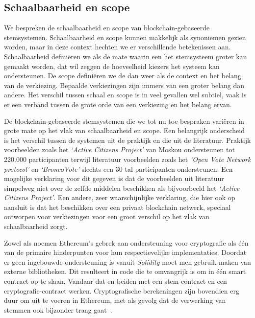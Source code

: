 	\subsection{Schaalbaarheid en scope}
	We bespreken de schaalbaarheid en scope van blockchain-gebaseerde stemsystemen. Schaalbaarheid en scope kunnen makkelijk als synoniemen gezien worden, maar in deze context hechten we er verschillende betekenissen aan. Schaalbaarheid definiëren we als de mate waarin een het stemsysteem groter kan gemaakt worden, dat wil zeggen de hoeveelheid kiezers het systeem kan ondersteunen. De scope definiëren we de dan weer als de context en het belang van de verkiezing. Bepaalde verkiezingen zijn immers van een groter belang dan andere. Het verschil tussen schaal en scope is in veel gevallen wel subtiel, vaak is er een verband tussen de grote orde van een verkiezing en het belang ervan.
	
	De blockchain-gebaseerde stemsystemen die we tot nu toe bespraken variëren in grote mate op het vlak van schaalbaarheid en scope. Een belangrijk onderscheid is het verschil tussen de systemen uit de praktijk en die uit de literatuur. Praktijk voorbeelden zoals het  \textit{`Active Citizens Project'} van Moskou ondersteunen tot 220.000 participanten terwijl literatuur voorbeelden zoals het  \textit{`Open Vote Network protocol'} en  \textit{`BroncoVote'} slechts een 30-tal participanten ondersteunen. Een mogelijke verklaring voor dit gegeven is dat de voorbeelden uit literatuur simpelweg niet over de zelfde middelen beschikken als bijvoorbeeld het \textit{`Active Citizens Project'}. Een andere, zeer waarschijnlijke verklaring, die hier ook op aansluit is dat het beschikken over een privaat blockchain netwerk, speciaal ontworpen voor verkiezingen voor een groot verschil op het vlak van schaalbaarheid zorgt.
	
	 Zowel \textcite{McCorry2017} als \textcite{Dagher2018} noemen Ethereum's gebrek aan ondersteuning voor cryptografie als één van de primaire hinderpunten voor hun respectievelijke implementaties. Doordat er geen ingebouwde ondersteuning is vanuit \textit{Solidity} moet men gebruik maken van externe bibliotheken. Dit resulteert in code die te omvangrijk is om in één smart contract op te slaan. Vandaar dat   \textcite{McCorry2017} en \textcite{Dagher2018} beiden met een stem-contract en een cryptografie-contract werken. Cryptografische berekeningen zijn bovendien erg duur om uit te voeren in Ethereum, met als gevolg dat de verwerking van stemmen ook bijzonder traag gaat~\autocite{Dagher2018}.
	 
